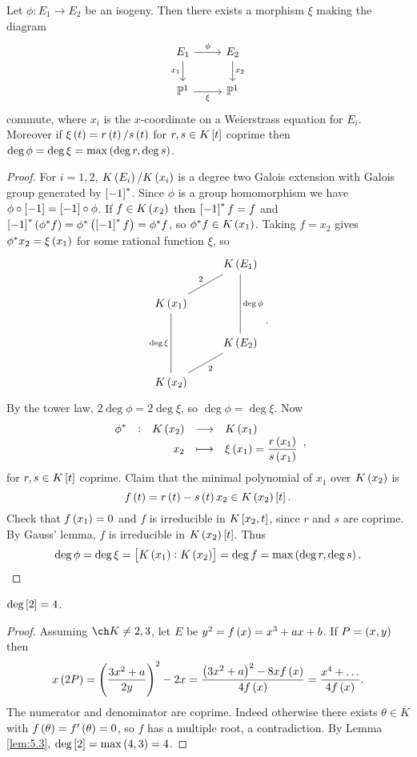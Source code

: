\begin{lemma}
\label{lem:5.3}
Let $ \phi : E_1 \to E_2 $ be an isogeny. Then there exists a morphism $ \xi $ making the diagram
$$
\begin{tikzcd}
E_1 \arrow{r}{\phi} \arrow{d}[swap]{x_1} & E_2 \arrow{d}{x_2} \\
\PP^1 \arrow{r}[swap]{\xi} & \PP^1
\end{tikzcd}
$$
commute, where $ x_i $ is the $ x $-coordinate on a Weierstrass equation for $ E_i $. Moreover if $ \xi\br{t} = r\br{t} / s\br{t} $ for $ r, s \in K\sbr{t} $ coprime then $ \deg \phi = \deg \xi = \max\br{\deg r, \deg s} $.
\end{lemma}

\pagebreak

\begin{proof}
For $ i = 1, 2 $, $ K\br{E_i} / K\br{x_i} $ is a degree two Galois extension with Galois group generated by $ \sbr{-1}^* $. Since $ \phi $ is a group homomorphism we have $ \phi \circ \sbr{-1} = \sbr{-1} \circ \phi $. If $ f \in K\br{x_2} $ then $ \sbr{-1}^*f = f $ and $ \sbr{-1}^*\br{\phi^*f} = \phi^*\br{\sbr{-1}^*f} = \phi^*f $, so $ \phi^*f \in K\br{x_1} $. Taking $ f = x_2 $ gives $ \phi^*x_2 = \xi\br{x_1} $ for some rational function $ \xi $, so
$$
\begin{tikzcd}
& K\br{E_1} \arrow[dash]{dl}[swap]{2} \arrow[dash]{dd}{\deg \phi} \\
K\br{x_1} \arrow[dash]{dd}[swap]{\deg \xi} & \\
& K\br{E_2} \arrow[dash]{dl}{2} \\
K\br{x_2} &
\end{tikzcd}.
$$
By the tower law, $ 2\deg \phi = 2\deg \xi $, so $ \deg \phi = \deg \xi $. Now
$$ \function[\phi^*]{K\br{x_2}}{K\br{x_1}}{x_2}{\xi\br{x_1} = \dfrac{r\br{x_1}}{s\br{x_1}}}, $$
for $ r, s \in K\sbr{t} $ coprime. Claim that the minimal polynomial of $ x_1 $ over $ K\br{x_2} $ is
$$ f\br{t} = r\br{t} - s\br{t}x_2 \in K\br{x_2}\sbr{t}. $$
Check that $ f\br{x_1} = 0 $ and $ f $ is irreducible in $ K\sbr{x_2, t} $, since $ r $ and $ s $ are coprime. By Gauss' lemma, $ f $ is irreducible in $ K\br{x_2}\sbr{t} $. Thus
$$ \deg \phi = \deg \xi = \sbr{K\br{x_1} : K\br{x_2}} = \deg f = \max\br{\deg r, \deg s}. $$
\end{proof}

\begin{lemma}
$ \deg \sbr{2} = 4 $.
\end{lemma}

\begin{proof}
Assuming $ \ch K \ne 2, 3 $, let $ E $ be $ y^2 = f\br{x} = x^3 + ax + b $. If $ P = \br{x, y} $ then
$$ x\br{2P} = \br{\dfrac{3x^2 + a}{2y}}^2 - 2x = \dfrac{\br{3x^2 + a}^2 - 8xf\br{x}}{4f\br{x}} = \dfrac{x^4 + \dots}{4f\br{x}}. $$
The numerator and denominator are coprime. Indeed otherwise there exists $ \theta \in \overline{K} $ with $ f\br{\theta} = f'\br{\theta} = 0 $, so $ f $ has a multiple root, a contradiction. By Lemma \ref{lem:5.3}, $ \deg \sbr{2} = \max\br{4, 3} = 4 $.
\end{proof}

